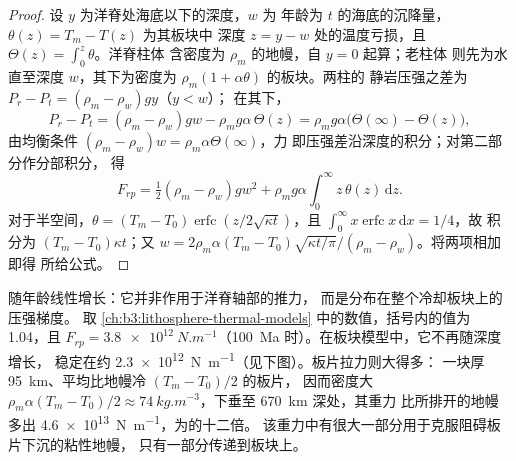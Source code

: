 \begin{proof}
设 $y$ 为洋脊处海底以下的深度，$w$ 为
年龄为 $t$ 的海底的沉降量，$\theta(z) = T_m - T(z)$ 为其板块中
深度 $z = y - w$ 处的温度亏损，且 $\Theta(z) = \int_0^z\theta$。洋脊柱体
含密度为 $\rho_m$ 的地幔，自 $y = 0$ 起算；老柱体
则先为水直至深度 $w$，其下为密度为 $\rho_m(1 + \alpha\theta)$ 的板块。两柱的
静岩压强之差为 $P_r - P_t = (\rho_m - \rho_w)gy$（$y < w$）；
在其下，
\[
  P_r - P_t = (\rho_m - \rho_w)gw - \rho_mg\alpha\,\Theta(z)
  = \rho_mg\alpha\bigl(\Theta(\infty) - \Theta(z)\bigr),
\]
由均衡条件 $(\rho_m - \rho_w)w = \rho_m\alpha\Theta(\infty)$，力
即压强差沿深度的积分；对第二部分作分部积分，
得
\[
  F_{rp} = \tfrac12(\rho_m - \rho_w)gw^2 + \rho_mg\alpha\int_0^\infty
  z\,\theta(z)\,\mathrm dz .
\]
对于半空间，$\theta = (T_m - T_0)\operatorname{erfc}(z/2\sqrt{\kappa
t})$，且 $\int_0^\infty x\operatorname{erfc}x\,\mathrm dx = 1/4$，故
积分为 $(T_m - T_0)\kappa t$；又 $w = 2\rho_m\alpha(T_m -
T_0)\sqrt{\kappa t/\pi}/(\rho_m - \rho_w)$。将两项相加即得
所给公式。
\end{proof}

随年龄线性增长：它并非作用于洋脊轴部的推力，
而是分布在整个冷却板块上的压强梯度。
取 \cref{ch:b3:lithosphere-thermal-models} 中的数值，括号内的值为 1.04，且 $F_{rp} =
\qty{3.8e12}{N.m^{-1}}$（\qty{100}{Ma} 时）。在板块模型中，它不再随深度增长，
稳定在约 \qty{2.3e12}{N.m^{-1}}（见下图）。板片拉力则大得多：
一块厚 \qty{95}{km}、平均比地幔冷 $(T_m - T_0)/2$ 的板片，
因而密度大 $\rho_m\alpha(T_m - T_0)/2 \approx
\qty{74}{kg.m^{-3}}$，下垂至 \qty{670}{km} 深处，其重力
比所排开的地幔多出 \qty{4.6e13}{N.m^{-1}}，为的十二倍。
该重力中有很大一部分用于克服阻碍板片下沉的粘性地幔，
只有一部分传递到板块上。

\begin{omfigure}

\par{}\label{fig:b3:mantle-convection:ridge-push}
\end{omfigure}

